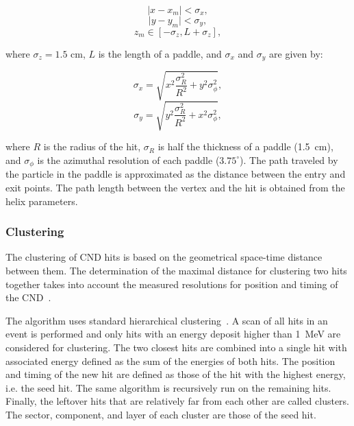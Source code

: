 \begin{equation}
\mid x-x_m \mid < \sigma_x ,
\end{equation}
\begin{equation}
\mid y-y_m \mid < \sigma_y ,
\end{equation}
\begin{equation}
z_m  \in [-\sigma_z,L+\sigma_z],
\end{equation}

\noindent
where $\sigma_z=1.5$ cm, $ L$ is the length of a paddle, and $\sigma_x$ and $\sigma_y$ are given by:

\begin{equation}
\sigma_x= \sqrt{x^2\frac{\sigma_R^2}{R^2}+y^2\sigma_\phi^2},
\end{equation}
\begin{equation}
\sigma_y= \sqrt{y^2\frac{\sigma_R^2}{R^2}+x^2\sigma_\phi^2},
\end{equation}

\noindent
where $R$ is the radius of the hit, $\sigma_R$ is half the thickness of a paddle (1.5~cm), and $\sigma_{\phi}$ is
the azimuthal resolution of each paddle ($3.75^\circ$). The path traveled by the particle in the paddle is
approximated as the distance between the entry and exit points. The path length between the vertex and the
hit is obtained from the helix parameters.

\subsubsection{Clustering}

The clustering of CND hits is based on the geometrical space-time distance between them. The determination of
the maximal distance for clustering two hits together takes into account the measured resolutions for position and
timing of the CND~\cite{cnd-nim}.

The algorithm uses standard hierarchical clustering~\cite{Day1984}. A scan of all hits in an event is performed and
only hits with an energy deposit higher than 1~MeV are considered for clustering. The two closest hits are combined
into a single hit with associated energy defined as the sum of the energies of both hits. The position and timing of
the new hit are defined as those of the hit with the highest energy, i.e. the seed hit. The same algorithm is
recursively run on the remaining hits. Finally, the leftover hits that are relatively far from each other are called
clusters. The sector, component, and layer of each cluster are those of the seed hit.
